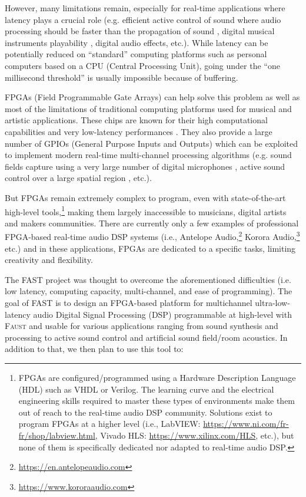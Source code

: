 \documentclass[a4paper,10pt]{article}
\newcommand{\F}{\textsc{Faust}}
\newcommand{\PP}{FAST}
\begin{document}
However, many limitations remain, especially for real-time applications where latency plays a crucial role (e.g. efficient active control of sound where audio processing should be faster than the propagation of sound \cite{elliott2000signal}, digital musical instruments playability \cite{Lago2004}, digital audio effects, etc.). While latency can be potentially reduced on ``standard'' computing platforms such as personal computers based on a CPU (Central Processing Unit), going under the ``one millisecond threshold'' is usually impossible because of buffering.

FPGAs (Field Programmable Gate Arrays) can help solve this problem as well as most of the limitations of traditional computing platforms used for musical and artistic applications. These chips are known for their high computational capabilities \cite{Choi2013,Pfeifle2012} and very low-latency performances \cite{Verstraelen2014}. They also provide a large number of GPIOs (General Purpose Inputs and Outputs) which can be exploited to implement modern real-time multi-channel processing algorithms (e.g. sound fields capture using a very large number of digital microphones \cite{salze2019new}, active sound control over a large spatial region \cite{Zhang2018}, etc.). 

But FPGAs remain extremely complex to program, even with state-of-the-art high-level tools,\footnote{FPGAs are configured/programmed using a Hardware Description Language (HDL) such as VHDL or Verilog. The learning curve and the electrical engineering skills required to master these types of environments make them out of reach to the real-time audio DSP community. Solutions exist to program FPGAs at a higher level (i.e., LabVIEW: \url{https://www.ni.com/fr-fr/shop/labview.html}, Vivado HLS: \url{https://www.xilinx.com/HLS}, etc.), but none of them is specifically dedicated nor adapted to real-time audio DSP.} making them largely inaccessible to musicians, digital artists and makers communities.
There are currently only a few examples of professional FPGA-based real-time audio DSP systems (i.e., Antelope Audio,\footnote{\url{https://en.antelopeaudio.com}} Korora Audio,\footnote{\url{https://www.kororaaudio.com}} etc.) and in these applications, FPGAs are dedicated to a specific tasks, limiting creativity and flexibility.

The \PP{} project was thought to overcome the aforementioned difficulties (i.e. low latency, computing capacity, multi-channel, and ease of programming). The goal of \PP{} is to design an FPGA-based platform for multichannel ultra-low-latency audio Digital Signal Processing (DSP) programmable at high-level with \F{} and usable for various applications ranging from sound synthesis and processing to active sound control and artificial sound field/room acoustics. In addition to that, we then plan to use this tool to: 
\end{document}
